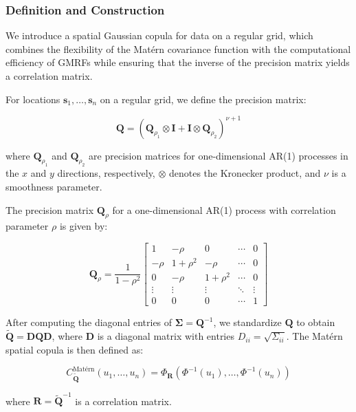 \subsubsection{Definition and Construction}
We introduce a spatial Gaussian copula for data on a regular grid, which combines the flexibility of the Matérn covariance function with the computational efficiency of GMRFs while ensuring that the inverse of the precision matrix yields a correlation matrix.

For locations $\mathbf{s}_1, \ldots, \mathbf{s}_n$ on a regular grid, we define the precision matrix:

\begin{equation}
\mathbf{Q} = (\mathbf{Q}_{\rho_1} \otimes \mathbf{I} + \mathbf{I} \otimes \mathbf{Q}_{\rho_2})^{\nu+1}
\end{equation}

where $\mathbf{Q}_{\rho_1}$ and $\mathbf{Q}_{\rho_2}$ are precision matrices for one-dimensional AR(1) processes in the $x$ and $y$ directions, respectively, $\otimes$ denotes the Kronecker product, and $\nu$ is a smoothness parameter.

The precision matrix $\mathbf{Q}_{\rho}$ for a one-dimensional AR(1) process with correlation parameter $\rho$ is given by:

\begin{equation}
\mathbf{Q}_{\rho} = \frac{1}{1-\rho^2}
\begin{bmatrix}
1 & -\rho & 0 & \cdots & 0 \\
-\rho & 1+\rho^2 & -\rho & \cdots & 0 \\
0 & -\rho & 1+\rho^2 & \cdots & 0 \\
\vdots & \vdots & \vdots & \ddots & \vdots \\
0 & 0 & 0 & \cdots & 1
\end{bmatrix}
\end{equation}

After computing the diagonal entries of $\mathbf{\Sigma} = \mathbf{Q}^{-1}$, we standardize $\mathbf{Q}$ to obtain $\tilde{\mathbf{Q}} = \mathbf{D}\mathbf{Q}\mathbf{D}$, where $\mathbf{D}$ is a diagonal matrix with entries $D_{ii} = \sqrt{\Sigma_{ii}}$. The Matérn spatial copula is then defined as:

\begin{equation}
C_{\tilde{\mathbf{Q}}}^{\text{Matérn}}(u_1, \ldots, u_n) = \Phi_{\mathbf{R}}(\Phi^{-1}(u_1), \ldots, \Phi^{-1}(u_n))
\end{equation}

where $\mathbf{R} = \tilde{\mathbf{Q}}^{-1}$ is a correlation matrix.

